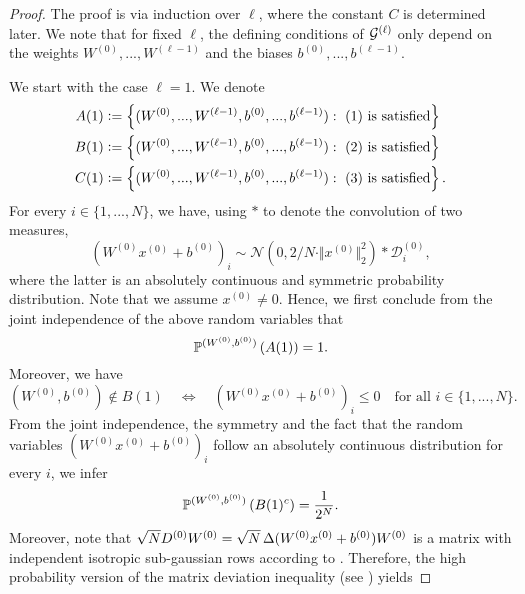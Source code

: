 \begin{proof}
The proof is via induction over $\ell$, where the constant $C$ is determined later. We note that for fixed $\ell$, the defining conditions of $\mathcal{G}^{(\ell)}$ only depend on the weights $W^{(0)},..., W^{(\ell - 1)}$ and the biases $b^{(0)},..., b^{(\ell - 1)}$. 

We start with the case $\ell = 1$. We denote
\begin{align*}
A(1) &\mathrel{\mathop:}= \left\{(W^{(0)},..., W^{(\ell - 1)}, b^{(0)}, ..., b^{(\ell - 1)}): \ \text{(1) is satisfied}\right\} \\
B(1) &\mathrel{\mathop:}= \left\{(W^{(0)},..., W^{(\ell - 1)}, b^{(0)}, ..., b^{(\ell - 1)}): \ \text{(2) is satisfied}\right\} \\
C(1) &\mathrel{\mathop:}= \left\{(W^{(0)},..., W^{(\ell - 1)}, b^{(0)}, ..., b^{(\ell - 1)}): \ \text{(3) is satisfied}\right\}.
\end{align*}
For every $i \in \{1,...,N\}$, we have, using $\ast$ to denote the convolution of two measures,
\begin{equation*}
\left(W^{(0)} x^{(0)} + b^{(0)} \right)_i \sim \mathcal{N}(0, 2/N \cdot \Vert x^{(0)} \Vert_2^2) \ast \mathcal{D}^{(0)}_i,
\end{equation*}
where the latter is an absolutely continuous and symmetric probability distribution. Note that we assume $x^{(0)} \neq 0$. Hence, we first conclude from the joint independence of the above random variables that
\begin{equation*}
\mathbb{P}^{(W^{(0)}, b^{(0)})} \left(A(1)\right) = 1.
\end{equation*}
Moreover, we have
\begin{equation*}
(W^{(0)}, b^{(0)}) \notin B(1) \quad \Longleftrightarrow \quad \left(W^{(0)} x^{(0)} + b^{(0)} \right)_i \leq 0 \quad \text{for all } i \in \{1,...,N\}.
\end{equation*}
From the joint independence, the symmetry and the fact that the random variables $\left(W^{(0)} x^{(0)} + b^{(0)} \right)_i$ follow an absolutely continuous distribution for every $i$, we infer
\begin{equation*}
\mathbb{P}^{(W^{(0)},b^{(0)})} \left(B(1)^c\right) = \frac{1}{2^N}.
\end{equation*}
Moreover, note that $\sqrt{N}D^{(0)}W^{(0)} = \sqrt{N}\operatorname{\Delta}(W^{(0)}x^{(0)}+ b^{(0)}) W^{(0)}$ is a matrix with independent isotropic sub-gaussian rows according to . Therefore, the high probability version of the matrix deviation inequality (see \cite[Theorem 3]{Liaw2017}) yields

\end{proof}
